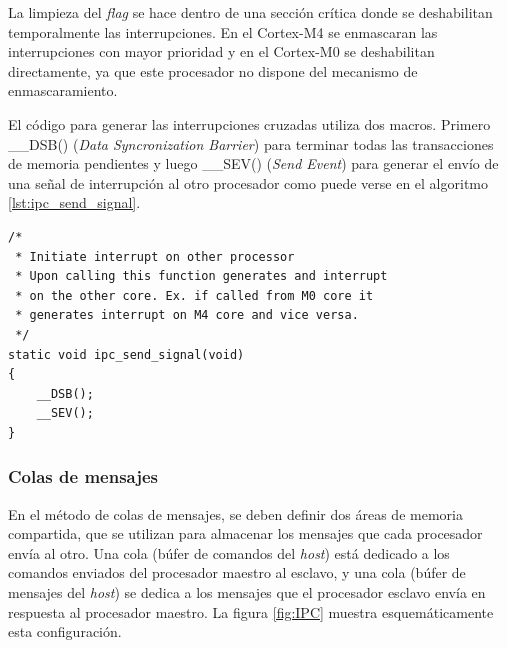 La limpieza del \textit{flag} se hace dentro de una sección crítica donde se deshabilitan temporalmente las interrupciones. En el Cortex-M4 se enmascaran las interrupciones con mayor prioridad y en el Cortex-M0 se deshabilitan directamente, ya que este procesador no dispone del mecanismo de enmascaramiento.

El código para generar las interrupciones cruzadas utiliza dos macros. Primero \_\_DSB() (\textit{Data Syncronization Barrier}) para terminar todas las transacciones de memoria pendientes y luego \_\_SEV() (\textit{Send Event}) para generar el envío de una señal de interrupción al otro procesador como puede verse en el algoritmo \ref{lst:ipc_send_signal}.

\begin{lstlisting}[caption={Función ipc\_send\_signal que permite generar una interrupción en el otro procesador.},label={lst:ipc_send_signal}]
/*
 * Initiate interrupt on other processor
 * Upon calling this function generates and interrupt 
 * on the other core. Ex. if called from M0 core it 
 * generates interrupt on M4 core and vice versa.
 */
static void ipc_send_signal(void)
{
  	__DSB();
  	__SEV();
}
\end{lstlisting}

\subsubsection{Colas de mensajes}
\label{subsubsec:colas}

En el método de colas de mensajes, se deben definir dos áreas de memoria compartida, que se utilizan para almacenar los mensajes que cada procesador envía al otro. Una cola (búfer de comandos del \textit{host}) está dedicado a los comandos enviados del procesador maestro al esclavo, y una cola (búfer de mensajes del \textit{host}) se dedica a los mensajes que el procesador esclavo envía en respuesta al procesador maestro. La figura \ref{fig:IPC} muestra esquemáticamente esta configuración.

\vspace{15px}

